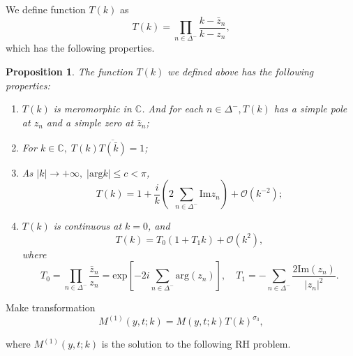 \documentclass[11pt]{article}
\numberwithin{equation}{section}
\newtheorem{Proposition}{Proposition}
\begin{document}
We define function $T(k)$ as
\begin{equation*}
    T(k)=\prod\limits_{n\in\Delta^-}\frac{k-\bar{z}_n}{k-z_n},
\end{equation*}
which has the following properties.
\begin{Proposition}\label{p19}
    The function $T(k)$ we defined above has the following properties:
    \begin{enumerate}[label=\textnormal{(\arabic*)}]
      \item $T(k)$ is meromorphic in $\mathbb{C} $. And for each $n \in \Delta^-, T(k)$ has a simple pole at $z_n$ and a simple zero at $\bar{z}_n$;
       \item For $k\in \mathbb{C},\;T(k)\overline{T(\bar{k})}=1$;
\item As $|k|\to+\infty,\;|\mathrm{arg}k|\leqslant c<\pi$,
$$T(k)=1+\frac{i}{k}\left(2\sum_{n\in\Delta^-}\mathrm{Im}z_n\right)+\mathcal{O}(k^{-2});$$

\item $T(k)$ is continuous at $k=0$, and
\begin{equation*}
    T(k)=T_0(1+T_1k)+\mathcal{O}(k^2),
\end{equation*}
where $$T_0=\prod\limits_{n\in\Delta^-}\frac{\bar{z}_n}{z_n}=\mathrm{exp}\left[-2i\sum_{n\in\Delta^-}\mathrm{arg}(z_n)\right],\quad T_1=-\sum_{n\in\Delta^-}\frac{2\mathrm{Im}(z_n)}{|z_n|^2}.$$



    \end{enumerate}
  \end{Proposition}






Make transformation
\begin{equation}\label{eq71}
    M^{(1)}(y,t;k)=M(y,t;k)T(k)^{\sigma_3},
\end{equation}

where $M^{(1)}(y,t;k)$ is the solution to the following RH problem.
\end{document}
